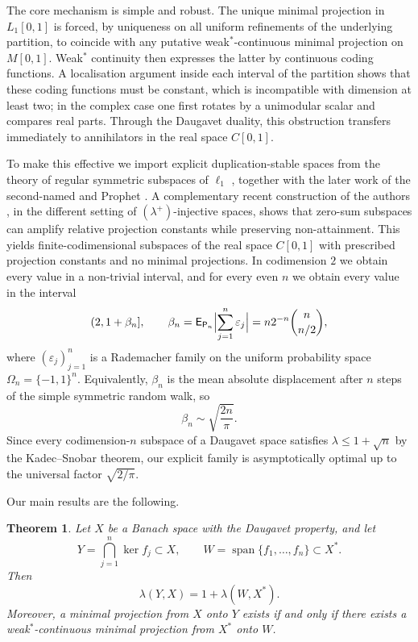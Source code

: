 \documentclass[11pt]{amsart}
\numberwithin{equation}{section}
\newtheorem{theorem}{Theorem}[section]
\theoremstyle{definition}
\theoremstyle{remark}
\newcommand{\Exp}{\mathsf E}
\newcommand{\Prob}{\mathsf P}
\DeclareMathOperator{\spanop}{span}
\begin{document}
The core mechanism is simple and robust. The unique minimal projection in $L_1[0,1]$ is forced, by uniqueness on all uniform refinements of the underlying partition, to coincide with any putative weak$^*$-continuous minimal projection on $M[0,1]$. Weak$^*$ continuity then expresses the latter by continuous coding functions. A localisation argument inside each interval of the partition shows that these coding functions must be constant, which is incompatible with dimension at least two; in the complex case one first rotates by a unimodular scalar and compares real parts. Through the Daugavet duality, this obstruction transfers immediately to annihilators in the real space $C[0,1]$.

To make this effective we import explicit duplication-stable spaces from the theory of regular symmetric subspaces of $\ell_1$ \cite{CL1,CL2,CL3,CL4}, together with the later work of the second-named and Prophet \cite{LP}. A complementary recent construction of the authors \cite{KL26}, in the different setting of $(\lambda^+)$-injective spaces, shows that zero-sum subspaces can amplify relative projection constants while preserving non-attainment. This yields finite-codimensional subspaces of the real space $C[0,1]$ with prescribed projection constants and no minimal projections. In codimension $2$ we obtain every value in a non-trivial interval, and for every even $n$ we obtain every value in the interval
\[
(2,1+\beta_n],
\qquad
\beta_n
=
\Exp_{\Prob_n}\Bigl|\sum_{j=1}^n \varepsilon_j\Bigr|
=
n2^{-n}\binom{n}{n/2},
\]
where $(\varepsilon_j)_{j=1}^n$ is a Rademacher family on the uniform probability space $\Omega_n=\{-1,1\}^n$. Equivalently, $\beta_n$ is the mean absolute displacement after $n$ steps of the simple symmetric random walk, so
\[
\beta_n\sim \sqrt{\frac{2n}{\pi}}.
\]
Since every codimension-$n$ subspace of a Daugavet space satisfies $\lambda\leqslant 1+\sqrt n$ by the Kadec--Snobar theorem, our explicit family is asymptotically optimal up to the universal factor $\sqrt{2/\pi}$.

Our main results are the following.

\begin{theorem}
\label{thm:intro-duality}
Let $X$ be a Banach space with the Daugavet property, and let
\[
Y=\bigcap_{j=1}^n \ker f_j\subset X,
\qquad
W=\spanop\{f_1,\dots,f_n\}\subset X^*.
\]
Then
\[
\lambda(Y,X)=1+\lambda(W,X^*).
\]
Moreover, a minimal projection from $X$ onto $Y$ exists if and only if there exists a weak$^*$-continuous minimal projection from $X^*$ onto $W$.
\end{theorem}
\end{document}
